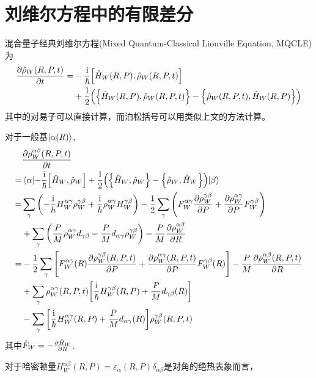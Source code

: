 \documentclass[UTF8,12pt]{article}
\begin{document}
    \section{刘维尔方程中的有限差分}
        混合量子经典刘维尔方程(Mixed Quantum-Classical Liouville Equation, MQCLE)为
        \begin{align}
            \pdv{\hat{\rho}_W(R,P,t)}{t}=&-\frac{\mathrm{i}}{\hbar}\comm{\hat{H}_W(R,P)}{\hat{\rho}_W(R,P,t)} \nonumber \\
            &+\frac{1}{2}\qty(\pb{\hat{H}_W(R,P)}{\hat{\rho}_W(R,P,t)}-\pb{\hat{\rho}_W(R,P,t)}{\hat{H}_W(R,P)})
        \end{align}
        其中的对易子可以直接计算，而泊松括号可以用类似上文的方法计算。\par
        对于一般基$\ket{\alpha(R)}$,
        \begin{align}
            &\pdv{\rho_W^{\alpha\beta}(R,P,t)}{t} \nonumber \\
            =&\mel{\alpha}{-\frac{\mathrm{i}}{\hbar}\comm{\hat{H}_W}{\hat{\rho}_W}+\frac{1}{2}\qty(\pb{\hat{H}_W}{\hat{\rho}_W}-\pb{\hat{\rho}_W}{\hat{H}_W})}{\beta} \\
            =&\sum_{\gamma}{\qty(-\frac{\mathrm{i}}{\hbar}H_W^{\alpha\gamma}\rho_W^{\gamma\beta}+\frac{\mathrm{i}}{\hbar}\rho_W^{\alpha\gamma}H_W^{\gamma\beta})}-\frac{1}{2}\sum_{\gamma}{\qty(F_W^{\alpha\gamma}\pdv{\rho_W^{\gamma\beta}}{P}+\pdv{\rho_W^{\alpha\gamma}}{P}F_W^{\gamma\beta})} \nonumber \\
            &+\sum_{\gamma}{\qty(\frac{P}{M}\rho_W^{\alpha\gamma}d_{\gamma\beta}-\frac{P}{M}d_{\alpha\gamma}\rho_W^{\gamma\beta})}-\frac{P}{M}\pdv{\rho_W^{\alpha\beta}}{R} \\
            =&-\frac{1}{2}\sum_{\gamma}{\qty[F_W^{\alpha\gamma}(R)\pdv{\rho_W^{\gamma\beta}(R,P,t)}{P}+\pdv{\rho_W^{\alpha\gamma}(R,P,t)}{P}F_W^{\gamma\beta}(R)]}-\frac{P}{M}\pdv{\rho_W^{\alpha\beta}(R,P,t)}{R} \nonumber \\
            &+\sum_{\gamma}{\rho_W^{\alpha\gamma}(R,P,t)\qty[\frac{\mathrm{i}}{\hbar}H_W^{\gamma\beta}(R,P)+\frac{P}{M}d_{\gamma\beta}(R)]} \nonumber \\
            &-\sum_{\gamma}{\qty[\frac{\mathrm{i}}{\hbar}H_W^{\alpha\gamma}(R,P)+\frac{P}{M}d_{\alpha\gamma}(R)]\rho_W^{\gamma\beta}(R,P,t)}
        \end{align}
        其中$\hat{F}_W=-\pdv{\hat{H}_W}{R}$.\par
        对于哈密顿量$H_W^{\alpha\beta}(R,P)=\varepsilon_\alpha(R,P)\delta_{\alpha\beta}$是对角的绝热表象而言，
\end{document}
